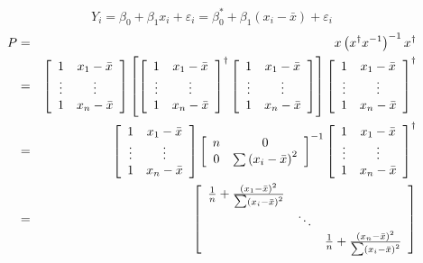 \documentclass{article}
\begin{document}
\begin{equation*}
Y_{i}=\beta _{0}+\beta _{1}x_{i}+\varepsilon _{i}=\beta _{0}^{\ast }+\beta
_{1}\left( x_{i}-\bar{x}\right) +\varepsilon _{i}
\end{equation*}%
\begin{eqnarray*}
P &=&x\left( x^{\dagger }x^{-1}\right) ^{-1}x^{\dagger } \\
&=&\left[ 
\begin{array}{cc}
1 & x_{1}-\bar{x} \\ 
\vdots  & \vdots  \\ 
1 & x_{n}-\bar{x}%
\end{array}%
\right] \left[ \left[ 
\begin{array}{cc}
1 & x_{1}-\bar{x} \\ 
\vdots  & \vdots  \\ 
1 & x_{n}-\bar{x}%
\end{array}%
\right] ^{\dagger }\left[ 
\begin{array}{cc}
1 & x_{1}-\bar{x} \\ 
\vdots  & \vdots  \\ 
1 & x_{n}-\bar{x}%
\end{array}%
\right] \right] \left[ 
\begin{array}{cc}
1 & x_{1}-\bar{x} \\ 
\vdots  & \vdots  \\ 
1 & x_{n}-\bar{x}%
\end{array}%
\right] ^{\dagger } \\
&=&\left[ 
\begin{array}{cc}
1 & x_{1}-\bar{x} \\ 
\vdots  & \vdots  \\ 
1 & x_{n}-\bar{x}%
\end{array}%
\right] \left[ 
\begin{array}{cc}
n & 0 \\ 
0 & \tsum \left( x_{i}-\bar{x}\right) ^{2}%
\end{array}%
\right] ^{-1}\left[ 
\begin{array}{cc}
1 & x_{1}-\bar{x} \\ 
\vdots  & \vdots  \\ 
1 & x_{n}-\bar{x}%
\end{array}%
\right] ^{\dagger } \\
&=&\left[ 
\begin{array}{ccc}
\frac{1}{n}+\frac{\left( x_{1}-\bar{x}\right) ^{2}}{\tsum \left( x_{i}-\bar{x%
}\right) ^{2}} &  &  \\ 
& \ddots  &  \\ 
&  & \frac{1}{n}+\frac{\left( x_{n}-\bar{x}\right) ^{2}}{\tsum \left( x_{i}-%
\bar{x}\right) ^{2}}%
\end{array}%
\right] 
\end{eqnarray*}
\end{document}
